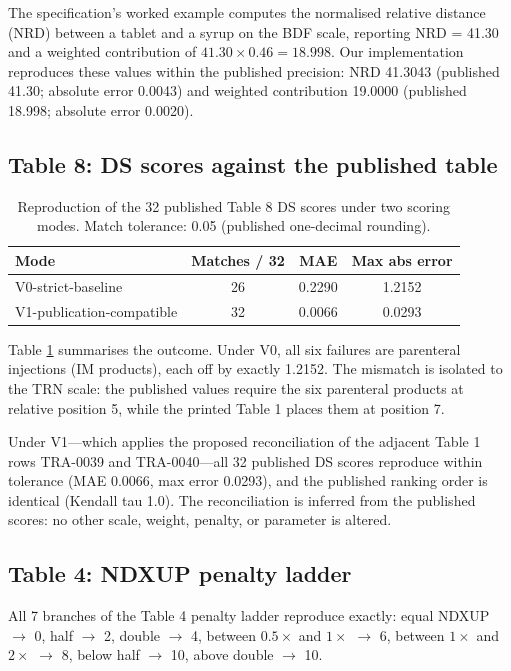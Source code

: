 \documentclass[twocolumn,a4paper]{elsarticle}
\begin{document}
The specification's worked example computes the normalised relative distance (NRD) between a tablet and a syrup on the BDF scale, reporting NRD = 41.30 and a weighted contribution of $41.30 \times 0.46 = 18.998$. Our implementation reproduces these values within the published precision: NRD 41.3043 (published 41.30; absolute error 0.0043) and weighted contribution 19.0000 (published 18.998; absolute error 0.0020).

\subsection{Table 8: DS scores against the published table}
\label{sec:results-table8}

\begin{table}[htbp]
\centering\small
\caption{Reproduction of the 32 published Table 8 DS scores under two scoring modes. Match tolerance: 0.05 (published one-decimal rounding).}
\label{tab:table8}
\begin{tabular}{@{}lccc@{}}
\toprule
Mode & Matches / 32 & MAE & Max abs error \\
\midrule
V0-strict-baseline & 26 & 0.2290 & 1.2152 \\
V1-publication-compatible & 32 & 0.0066 & 0.0293 \\
\bottomrule
\end{tabular}
\end{table}

Table \ref{tab:table8} summarises the outcome. Under V0, all six failures are parenteral injections (IM products), each off by exactly 1.2152. The mismatch is isolated to the TRN scale: the published values require the six parenteral products at relative position 5, while the printed Table 1 places them at position 7.

Under V1---which applies the proposed reconciliation of the adjacent Table 1 rows TRA-0039 and TRA-0040---all 32 published DS scores reproduce within tolerance (MAE 0.0066, max error 0.0293), and the published ranking order is identical (Kendall tau 1.0). The reconciliation is inferred from the published scores: no other scale, weight, penalty, or parameter is altered.

\subsection{Table 4: NDXUP penalty ladder}
\label{sec:results-table4}

All 7 branches of the Table 4 penalty ladder reproduce exactly: equal NDXUP $\to$ 0, half $\to$ 2, double $\to$ 4, between $0.5\times$ and $1\times$ $\to$ 6, between $1\times$ and $2\times$ $\to$ 8, below half $\to$ 10, above double $\to$ 10.
\end{document}
